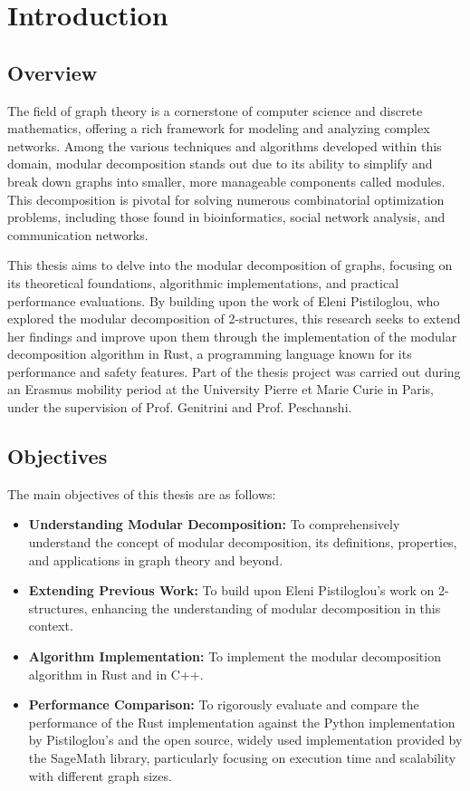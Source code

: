 
\chapter{Introduction}\label{ch:introduction}


\section{Overview}\label{sec:overview}

The field of graph theory is a cornerstone of computer science and discrete mathematics, offering a rich framework for modeling and analyzing complex networks.
Among the various techniques and algorithms developed within this domain, modular decomposition stands out due to its ability to simplify and break down graphs into smaller, more manageable components called modules.
This decomposition is pivotal for solving numerous combinatorial optimization problems, including those found in bioinformatics, social network analysis, and communication networks.

This thesis aims to delve into the modular decomposition of graphs, focusing on its theoretical foundations, algorithmic implementations, and practical performance evaluations.
By building upon the work of Eleni Pistiloglou, who explored the modular decomposition of 2-structures, this research seeks to extend her findings and improve upon them through the implementation of the modular decomposition algorithm in Rust, a programming language known for its performance and safety features.
Part of the thesis project was carried out during an Erasmus mobility period at the University Pierre et Marie Curie in Paris, under the supervision of Prof. Genitrini and Prof. Peschanshi.

\section{Objectives}\label{sec:objectives}

The main objectives of this thesis are as follows:

\begin{itemize}
    \item \textbf{Understanding Modular Decomposition:} To comprehensively understand the concept of modular decomposition, its definitions, properties, and applications in graph theory and beyond.
    \item \textbf{Extending Previous Work:} To build upon Eleni Pistiloglou's work on 2-structures, enhancing the understanding of modular decomposition in this context.
    \item \textbf{Algorithm Implementation:} To implement the modular decomposition algorithm in Rust and in C++.
    \item \textbf{Performance Comparison:} To rigorously evaluate and compare the performance of the Rust implementation against the Python implementation by Pistiloglou's and the open source, widely used implementation provided by the SageMath library, particularly focusing on execution time and scalability with different graph sizes.
\end{itemize}


